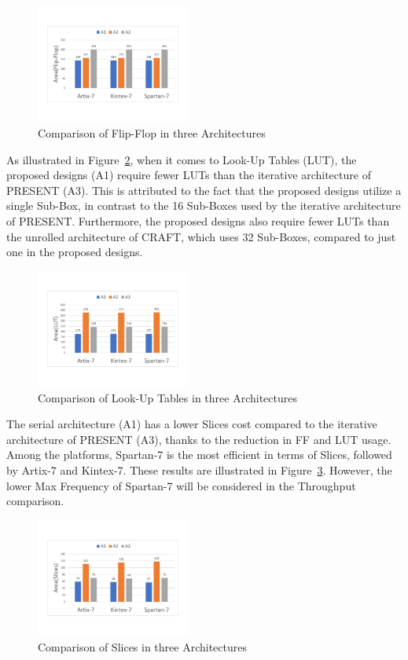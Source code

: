 \documentclass[final,5p,times,twocolumn]{elsarticle}
\begin{document}
\begin{figure}
    \centering
    \includegraphics[width=0.45\textwidth]{compare-ff.pdf}
    \caption{Comparison of Flip-Flop in three Architectures}\label{compare_ff}
\end{figure}

As illustrated in Figure~\ref{compare_lut}, when it comes to Look-Up Tables (LUT), the proposed designs (A1) require fewer LUTs than the iterative architecture of PRESENT (A3). This is attributed to the fact that the proposed designs utilize a single Sub-Box, in contrast to the 16 Sub-Boxes used by the iterative architecture of PRESENT. Furthermore, the proposed designs also require fewer LUTs than the unrolled architecture of CRAFT, which uses 32 Sub-Boxes, compared to just one in the proposed designs.

\begin{figure}
    \centering
    \includegraphics[width=0.45\textwidth]{compare-lut.pdf}
    \caption{Comparison of Look-Up Tables in three Architectures}\label{compare_lut}
\end{figure}

The serial architecture (A1) has a lower Slices cost compared to the iterative architecture of PRESENT (A3), thanks to the reduction in FF and LUT usage. Among the platforms, Spartan-7 is the most efficient in terms of Slices, followed by Artix-7 and Kintex-7. These results are illustrated in Figure~\ref{compare-slices}. However, the lower Max Frequency of Spartan-7 will be considered in the Throughput comparison.

\begin{figure}
    \centering
    \includegraphics[width=0.45\textwidth]{compare-slices.pdf}
    \caption{Comparison of Slices in three Architectures}\label{compare-slices}
\end{figure}
\end{document}
